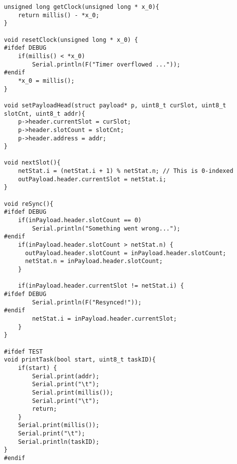 \begin{lstlisting}[style=customc]
unsigned long getClock(unsigned long * x_0){
    return millis() - *x_0; 
}

void resetClock(unsigned long * x_0) {
#ifdef DEBUG
    if(millis() < *x_0)
        Serial.println(F("Timer overflowed ..."));
#endif
    *x_0 = millis();
}

void setPayloadHead(struct payload* p, uint8_t curSlot, uint8_t slotCnt, uint8_t addr){
    p->header.currentSlot = curSlot;
    p->header.slotCount = slotCnt;
    p->header.address = addr;  
}

void nextSlot(){
    netStat.i = (netStat.i + 1) % netStat.n; // This is 0-indexed
    outPayload.header.currentSlot = netStat.i;  
}

void reSync(){
#ifdef DEBUG
    if(inPayload.header.slotCount == 0)
        Serial.println("Something went wrong...");
#endif
    if(inPayload.header.slotCount > netStat.n) {
      outPayload.header.slotCount = inPayload.header.slotCount;
      netStat.n = inPayload.header.slotCount;
    }

    if(inPayload.header.currentSlot != netStat.i) {
#ifdef DEBUG
        Serial.println(F("Resynced!"));
#endif
        netStat.i = inPayload.header.currentSlot;
    }
}

#ifdef TEST
void printTask(bool start, uint8_t taskID){
    if(start) {
        Serial.print(addr);
        Serial.print("\t");
        Serial.print(millis());
        Serial.print("\t");
        return;
    }
    Serial.print(millis());
    Serial.print("\t");
    Serial.println(taskID);
}
#endif
\end{lstlisting}